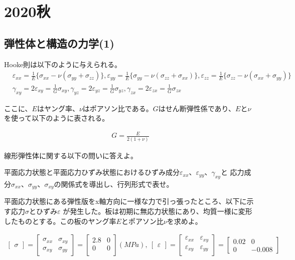 \newpage
\section{2020秋}
\setcounter{yearcounter}{2020}

\subsection{弾性体と構造の力学(1)}

Hooke則は以下のように与えられる。
\begin{align*}%
  &\varepsilon_{xx} = \frac{1}{E}\{\sigma_{xx}-\nu(\sigma_{yy}+\sigma_{zz})\},
  \varepsilon_{yy} = \frac{1}{E}\{\sigma_{yy}-\nu(\sigma_{zz}+\sigma_{xx})\},
  \varepsilon_{zz} = \frac{1}{E}\{\sigma_{zz}-\nu(\sigma_{xx}+\sigma_{yy})\}\\
  &\gamma_{xy} = 2\varepsilon_{xy} = \frac{1}{G}\sigma_{xy},
  \gamma_{yz} = 2\varepsilon_{yz} = \frac{1}{G}\sigma_{yz},
  \gamma_{zx} = 2\varepsilon_{zx} = \frac{1}{G}\sigma_{zx}
\end{align*}

ここに、$E$はヤング率、$\nu$はポアソン比である。$G$はせん断弾性係であり、$E$と$\nu$を使って以下のように表される。

\begin{align*}%
  G = \frac{E}{2(1+\nu)}
\end{align*}

線形弾性体に関する以下の問いに答えよ。

平面応力状態と平面応力ひずみ状態におけるひずみ成分$\varepsilon_{xx}$、$\varepsilon_{yy}$、$\gamma_{xy}$と
応力成分$\sigma_{xx}$、$\sigma_{yy}$、$\sigma_{xy}$の関係式を導出し、行列形式で表せ。

平面応力状態にある弾性版をx軸方向に一様な力で引っ張ったところ、以下に示す応力$\sigma$とひずみ$\varepsilon$
が発生した。板は初期に無応力状態にあり、均質一様に変形したものとする。この板のヤング率$E$とポアソン比$\nu$を求めよ。

\begin{align*}%
  \begin{bmatrix}
    \sigma
  \end{bmatrix}
  =
  \begin{bmatrix}
    \sigma_{xx}&\sigma_{xy}\\
    \sigma_{xy}&\sigma_{yy}
  \end{bmatrix}
  =
  \begin{bmatrix}
    2.8&0\\
    0&0\\
  \end{bmatrix}
  (MPa),\:
  \begin{bmatrix}
    \varepsilon
  \end{bmatrix}
  =
  \begin{bmatrix}
    \varepsilon_{xx}&\varepsilon_{xy}\\
    \varepsilon_{xy}&\varepsilon_{yy}\\
  \end{bmatrix}
  =
  \begin{bmatrix}
    0.02&0\\
    0&-0.008
  \end{bmatrix}
\end{align*}

